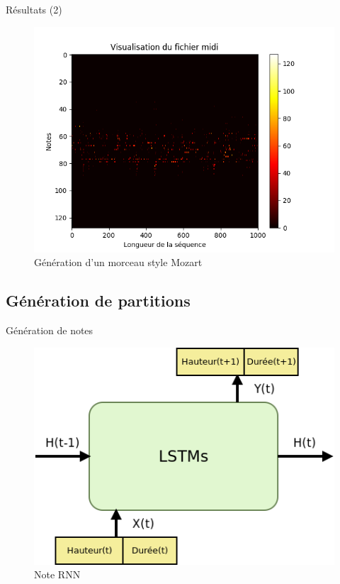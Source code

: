 \documentclass{beamer}
\begin{document}
\begin{frame}{Résultats (2)}

\begin{figure}
\begin{center}
\includegraphics[width=0.9\linewidth]{images/mozart_generated_100000.png}
\caption{Génération d'un morceau style Mozart}
\end{center}
\end{figure}
\end{frame}


\subsection{Génération de partitions}

\begin{frame}{Génération de notes}
\begin{figure}
\begin{center}
\includegraphics[scale=0.5]{images/note_rnn.png}
\caption{Note RNN}
\end{center}
\end{figure}
\end{frame}
\end{document}
